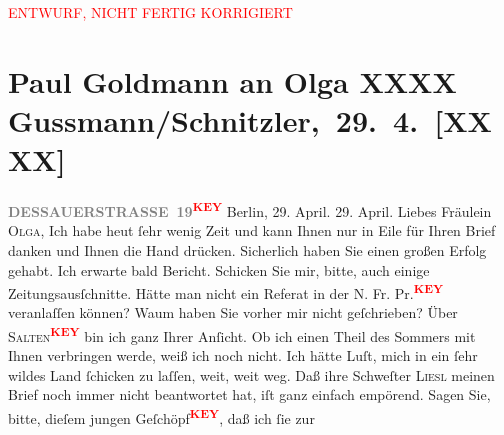 
\begin{center}
            \textcolor{red}{ENTWURF, NICHT FERTIG KORRIGIERT}
                      \end{center}
            
         
         \renewcommand{\erwaehntePersonen}{Personen: Olga Schnitzler}
         \renewcommand{\erwaehnteOrte}{Orte: Berlin, Wien}
         \renewcommand{\erwaehnteWerke}{}
               \section[ Paul Goldmann an Olga XXXX Gussmann/Schnitzler, 29. 4. {[}XXXX{]}]{ Paul Goldmann an Olga XXXX Gussmann/Schnitzler, 29. 4. {[}XXXX{]}}\nopagebreak{}\rehead{ }\begin{ledgroupsized}[t]{13cm}\normalsize\beginnumbering \toendnotes[C]{\smallbreak\pagebreak[2]} 
\toendnotes[C]{\smallbreak}{\pb}\textcolor{gray}{\textbf{DESSAUERSTRASSE 19}}\textcolor{red}{\textsuperscript{\textbf{KEY}}}\pstart
           Berlin, 29. April. 29.
                     April.\pend
           \pstart{}Liebes Fräulein \textsc{Olga},\pend\pstart
           \pend
           \pstart
           Ich habe heut ſehr wenig Zeit und kann Ihnen nur in Eile für Ihren Brief
               danken und Ihnen die Hand drücken. Sicherlich haben Sie einen großen Erfolg gehabt.
               Ich erwarte bald Bericht. Schicken Sie mir, bitte, auch einige Zeitungsausſchnitte.
               Hätte man nicht ein Referat in der N. Fr. Pr.\textcolor{red}{\textsuperscript{\textbf{KEY}}} veranlaſſen
               können? Waum haben Sie vorher mir nicht  geſchrieben? {\pb}\pend
           \pstart
           Über \textsc{Salten\textcolor{red}{\textsuperscript{\textbf{KEY}}}} bin ich ganz Ihrer Anſicht.\pend
           \pstart
           Ob ich einen Theil des Sommers mit Ihnen verbringen werde, weiß ich noch nicht. Ich
               hätte Luſt, mich in ein ſehr wildes Land ſchicken zu laſſen, weit, weit weg.\pend
           \pstart
           Daß ihre Schweſter \textsc{Liesl} meinen Brief noch immer nicht beantwortet hat, iſt ganz einfach empörend. Sagen
               Sie, bitte, dieſem jungen Geſchöpf\textcolor{red}{\textsuperscript{\textbf{KEY}}}, daß ich ſie zur

\end{ledgroupsized}
